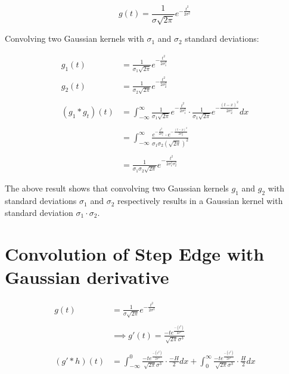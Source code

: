 \documentclass[12pt, oneside]{article}
\begin{document}
$$ g(t) = \frac{1}{\sigma \sqrt{2 \pi}}e^{-\frac{t^2}{2 \sigma ^ 2}} $$

Convolving two Gaussian kernels with $\sigma_1$ and $\sigma_2$ standard
deviations:

\begin{align*}
    g_1(t) &= \frac{1}{\sigma_1 \sqrt{2 \pi}}e^{-\frac{t^2}{2 \sigma_1 ^ 2}}  \\
    g_2(t) &= \frac{1}{\sigma_2 \sqrt{2 \pi}}e^{-\frac{t^2}{2 \sigma_2 ^ 2}}  \\\\
    (g_1 * g_t)(t) &= 
    \int_{-\infty}^{\infty} 
    \frac{1}{\sigma_1 \sqrt{2 \pi}}e^{-\frac{t^2}{2 \sigma_1 ^ 2}} 
    \cdot
    \frac{1}{\sigma_1 \sqrt{2 \pi}}e^{-\frac{(t-x)^2}{2 \sigma_2 ^ 2}} dx  \\\\
    &= \int_{-\infty}^{\infty} 
    \frac{  e^{-\frac{t^2}{2 \sigma_1 ^ 2}} \cdot 
            e^{-\frac{(t-x)^2}{2 \sigma_2 ^ 2}}}{ 
                \sigma_1 \sigma_2 (\sqrt{2 \pi})^2}    \\\\
    &= \frac{1}{\sigma_1 \sigma_2 \sqrt{2 \pi}}
    e^{-\frac{t^2}{2 \sigma_1 ^ 2 \sigma_2 ^ 2 }} 
\end{align*}

The above result shows that convolving two Gaussian kernels $g_1$ and $g_2$
with standard deviations $\sigma_1$ and $\sigma_2$ respectively results in
a Gaussian kernel with standard deviation $\sigma_1 \cdot \sigma_2$.

\section{Convolution of Step Edge with Gaussian derivative}

\begin{align*}
    g(t) &= \frac{1}{\sigma \sqrt{2 \pi}}e^{-\frac{t^2}{2 \sigma ^ 2}}  \\\\
    &\implies g'(t) =  \frac{-t e^{\frac{-(t ^ 2)}{2 \sigma ^ 2}} }{ 
    \sqrt{2 \pi} \sigma ^ 3} \\\\
    (g' * h)(t) &= 
    \int_{-\infty}^{0} 
    \frac{-t e^{\frac{-(t ^ 2)}{2 \sigma ^ 2}} }{ 
    \sqrt{2 \pi} \sigma ^ 3}
    \cdot
    \frac{-H}{2} dx  +
    \int_{0}^{\infty} 
    \frac{-t e^{\frac{-(t ^ 2)}{2 \sigma ^ 2}} }{ 
    \sqrt{2 \pi} \sigma ^ 3}
    \cdot
    \frac{H}{2} dx  
\end{align*}
\end{document}
